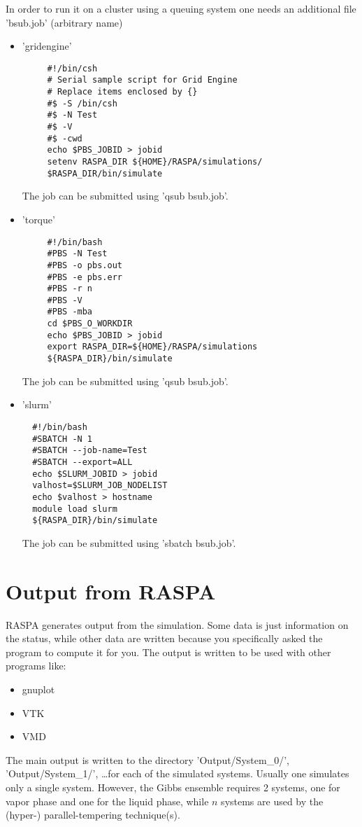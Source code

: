 In order to run it on a cluster using a queuing system one needs an additional file 'bsub.job' (arbitrary name)
\begin{itemize}
 \item{'gridengine'}
  \begin{verbatim}
     #!/bin/csh
     # Serial sample script for Grid Engine
     # Replace items enclosed by {}
     #$ -S /bin/csh
     #$ -N Test
     #$ -V
     #$ -cwd
     echo $PBS_JOBID > jobid
     setenv RASPA_DIR ${HOME}/RASPA/simulations/
     $RASPA_DIR/bin/simulate
  \end{verbatim}
The job can be submitted using 'qsub bsub.job'.
 \item{'torque'}
  \begin{verbatim}
     #!/bin/bash
     #PBS -N Test
     #PBS -o pbs.out
     #PBS -e pbs.err
     #PBS -r n
     #PBS -V
     #PBS -mba
     cd $PBS_O_WORKDIR
     echo $PBS_JOBID > jobid
     export RASPA_DIR=${HOME}/RASPA/simulations
     ${RASPA_DIR}/bin/simulate
  \end{verbatim}
The job can be submitted using 'qsub bsub.job'.
 \item{'slurm'}
\begin{verbatim}
  #!/bin/bash 
  #SBATCH -N 1
  #SBATCH --job-name=Test
  #SBATCH --export=ALL
  echo $SLURM_JOBID > jobid
  valhost=$SLURM_JOB_NODELIST
  echo $valhost > hostname
  module load slurm
  ${RASPA_DIR}/bin/simulate
\end{verbatim}
The job can be submitted using 'sbatch bsub.job'.
\end{itemize}


\section{Output from RASPA}
RASPA generates output from the simulation. Some data is just information on the status, while other data are written because you
specifically asked the program to compute it for you. The output is written to be used with other programs like:
\begin{itemize}
 \item{gnuplot}
 \item{VTK}
 \item{VMD}
\end{itemize}

The main output is written to the directory 'Output/System\_0/', 'Output/System\_1/', \dots for each of the simulated
systems. Usually one simulates only a single system. However, the Gibbs ensemble requires 2 systems, one for vapor phase and one
for the liquid phase, while $n$ systems are used by the (hyper-) parallel-tempering technique(s).

